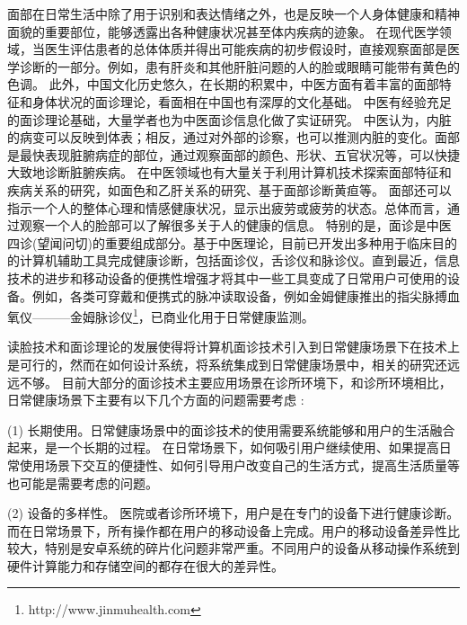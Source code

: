 面部在日常生活中除了用于识别和表达情绪之外，也是反映一个人身体健康和精神面貌的重要部位，能够透露出各种健康状况甚至体内疾病的迹象。
在现代医学领域，当医生评估患者的总体体质并得出可能疾病的初步假设时，直接观察面部是医学诊断的一部分\cite{Clifford2006Shortliffe}。例如，患有肝炎和其他肝脏问题的人的脸或眼睛可能带有黄色的色调\cite{Li2008Therapeutic}。
此外，中国文化历史悠久，在长期的积累中，中医方面有着丰富的面部特征和身体状况的面诊理论，看面相在中国也有深厚的文化基础。
中医有经验充足的面诊理论基础，大量学者也为中医面诊信息化做了实证研究。
中医认为，内脏的病变可以反映到体表；相反，通过对外部的诊察，也可以推测内脏的变化\cite{杨淑芳2002伤寒六经辨证初探}。面部是最快表现脏腑病症的部位，通过观察面部的颜色、形状、五官状况等，可以快捷大致地诊断脏腑疾病。
在中医领域也有大量关于利用计算机技术探索面部特征和疾病关系的研究，如面色和乙肝关系的研究\cite{杨宏志2007慢性乙型肝炎肝硬化中医面部五色诊断与临床病理的相关性研究}、基于面部诊断黄疸\cite{艾英1998黄疸病人面部色泽定量实验研究}等。
面部还可以指示一个人的整体心理和情感健康状况，显示出疲劳或疲劳的状态。总体而言，通过观察一个人的脸部可以了解很多关于人的健康的信息。
特别的是，面诊是中医四诊(望闻问切)的重要组成部分。基于中医理论，目前已开发出多种用于临床目的的计算机辅助工具完成健康诊断，包括面诊仪\cite{Liu2014Computerized}，舌诊仪\cite{Wang2004An}和脉诊仪\cite{Shu2007Developing}。直到最近，信息技术的进步和移动设备的便携性增强才将其中一些工具变成了日常用户可使用的设备。例如，各类可穿戴和便携式的脉冲读取设备，例如金姆健康推出的指尖脉搏血氧仪———金姆脉诊仪\footnote{http://www.jinmuhealth.com}，已商业化用于日常健康监测。


读脸技术和面诊理论的发展使得将计算机面诊技术引入到日常健康场景下在技术上是可行的，然而在如何设计系统，将系统集成到日常健康场景中，相关的研究还远远不够。
目前大部分的面诊技术主要应用场景在诊所环境下，和诊所环境相比，日常健康场景下主要有以下几个方面的问题需要考虑\cite{Clawson2015No} \cite{Epstein2016Beyond} \cite{lupton2017self-tracking}: 

(1) 长期使用。日常健康场景中的面诊技术的使用需要系统能够和用户的生活融合起来，是一个长期的过程。 在日常场景下，如何吸引用户继续使用、如果提高日常使用场景下交互的便捷性、如何引导用户改变自己的生活方式，提高生活质量等也可能是需要考虑的问题。

(2) 设备的多样性。 医院或者诊所环境下，用户是在专门的设备下进行健康诊断。而在日常场景下，所有操作都在用户的移动设备上完成。用户的移动设备差异性比较大，特别是安卓系统的碎片化问题非常严重。不同用户的设备从移动操作系统到硬件计算能力和存储空间的都存在很大的差异性。

